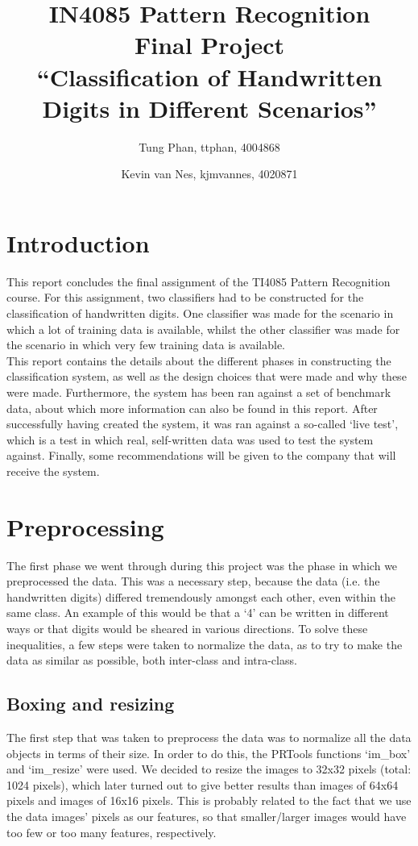 \documentclass[11pt,twoside,a4paper]{article}
\title{
  IN4085 Pattern Recognition\\
  Final Project\\
  ``Classification of Handwritten Digits in Different Scenarios''
}
\author{
    Tung Phan, ttphan, 4004868 \and
    Kevin van Nes, kjmvannes, 4020871
}
\begin{document}
\maketitle

\section{Introduction}
This report concludes the final assignment of the TI4085 Pattern Recognition course. For this assignment, two classifiers had to be constructed for the classification of handwritten digits. One classifier was made for the scenario in which a lot of training data is available, whilst the other classifier was made for the scenario in which very few training data is available.\\
This report contains the details about the different phases in constructing the classification system, as well as the design choices that were made and why these were made. Furthermore, the system has been ran against a set of benchmark data, about which more information can also be found in this report. After successfully having created the system, it was ran against a so-called `live test', which is a test in which real, self-written data was used to test the system against. Finally, some recommendations will be given to the company that will receive the system.


\section{Preprocessing}
The first phase we went through during this project was the phase in which we preprocessed the data. This was a necessary step, because the data (i.e. the handwritten digits) differed tremendously amongst each other, even within the same class. An example of this would be that a `4' can be written in different ways or that digits would be sheared in various directions. To solve these inequalities, a few steps were taken to normalize the data, as to try to make the data as similar as possible, both inter-class and intra-class.

\subsection{Boxing and resizing}
The first step that was taken to preprocess the data was to normalize all the data objects in terms of their size. In order to do this, the PRTools functions `im\_box' and `im\_resize' were used. We decided to resize the images to 32x32 pixels (total: 1024 pixels), which later turned out to give better results than images of 64x64 pixels and images of 16x16 pixels. This is probably related to the fact that we use the data images' pixels as our features, so that smaller/larger images would have too few or too many features, respectively.
\end{document}
